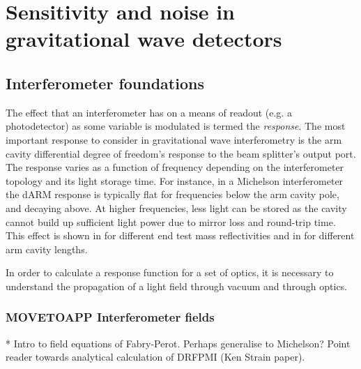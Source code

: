 \chapter{Sensitivity and noise in gravitational wave detectors}
\label{c:instrumentation}

\section{Interferometer foundations}

The effect that an interferometer has on a means of readout (e.g. a photodetector) as some variable is modulated is termed the \emph{response}. The most important response to consider in gravitational wave interferometry is the arm cavity differential degree of freedom's response to the beam splitter's output port. The response varies as a function of frequency depending on the interferometer topology and its light storage time. For instance, in a Michelson interferometer the dARM response is typically flat for frequencies below the arm cavity pole, and decaying  above. At higher frequencies, less light can be stored as the cavity cannot build up sufficient light power due to mirror loss and round-trip time. This effect is shown in  for different end test mass reflectivities and in  for different arm cavity lengths.

In order to calculate a response function for a set of optics, it is necessary to understand the propagation of a light field through vacuum and through optics.


\subsection{MOVETOAPP Interferometer fields}
* Intro to field equations of Fabry-Perot. Perhaps generalise to Michelson? Point reader towards analytical calculation of DRFPMI (Ken Strain paper).

